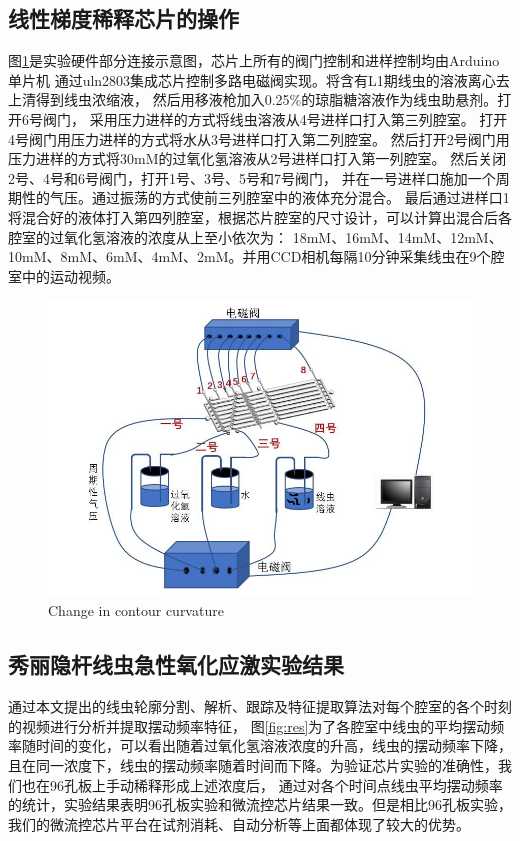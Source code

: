 \subsection{线性梯度稀释芯片的操作}
	图\ref{fig:sysdevice}是实验硬件部分连接示意图，芯片上所有的阀门控制和进样控制均由Arduino单片机
	通过uln2803集成芯片控制多路电磁阀实现。将含有L1期线虫的溶液离心去上清得到线虫浓缩液，
	然后用移液枪加入0.25\%的琼脂糖溶液作为线虫助悬剂。打开6号阀门，
	采用压力进样的方式将线虫溶液从4号进样口打入第三列腔室。
	打开4号阀门用压力进样的方式将水从3号进样口打入第二列腔室。
	然后打开2号阀门用压力进样的方式将30mM的过氧化氢溶液从2号进样口打入第一列腔室。
	然后关闭2号、4号和6号阀门，打开1号、3号、5号和7号阀门，
	并在一号进样口施加一个周期性的气压。通过振荡的方式使前三列腔室中的液体充分混合。
	最后通过进样口1将混合好的液体打入第四列腔室，根据芯片腔室的尺寸设计，可以计算出混合后各腔室的过氧化氢溶液的浓度从上至小依次为：
	18mM、16mM、14mM、12mM、10mM、8mM、6mM、4mM、2mM。并用CCD相机每隔10分钟采集线虫在9个腔室中的运动视频。
	\begin{figure}[h]
	  \centering
	  \includegraphics[width=12cm]{figure/chap5/hardware.jpg}
		{Change in contour curvature}
	  \label{fig:sysdevice}
	\end{figure}
\subsection{秀丽隐杆线虫急性氧化应激实验结果}
	通过本文提出的线虫轮廓分割、解析、跟踪及特征提取算法对每个腔室的各个时刻的视频进行分析并提取摆动频率特征，
	图\ref{fig:res}为了各腔室中线虫的平均摆动频率随时间的变化，可以看出随着过氧化氢溶液浓度的升高，线虫的摆动频率下降，
	且在同一浓度下，线虫的摆动频率随着时间而下降。为验证芯片实验的准确性，我们也在96孔板上手动稀释形成上述浓度后，
	通过对各个时间点线虫平均摆动频率的统计，实验结果表明96孔板实验和微流控芯片结果一致。但是相比96孔板实验，
	我们的微流控芯片平台在试剂消耗、自动分析等上面都体现了较大的优势。
	
